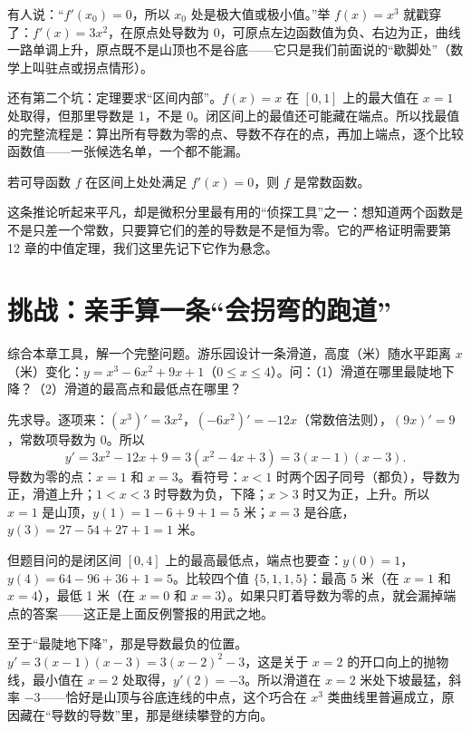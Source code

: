 \begin{fanli}
有人说：“$f'(x_0)=0$，所以 $x_0$ 处是极大值或极小值。”举 $f(x)=x^3$ 就戳穿了：$f'(x)=3x^2$，在原点处导数为 0，可原点左边函数值为负、右边为正，曲线一路单调上升，原点既不是山顶也不是谷底——它只是我们前面说的“歇脚处”（数学上叫驻点或拐点情形）。

还有第二个坑：定理要求“区间内部”。$f(x)=x$ 在 $[0,1]$ 上的最大值在 $x=1$ 处取得，但那里导数是 1，不是 0。闭区间上的最值还可能藏在端点。所以找最值的完整流程是：算出所有导数为零的点、导数不存在的点，再加上端点，逐个比较函数值——一张候选名单，一个都不能漏。
\end{fanli}

\begin{tuilun}
若可导函数 $f$ 在区间上处处满足 $f'(x)=0$，则 $f$ 是常数函数。
\end{tuilun}

这条推论听起来平凡，却是微积分里最有用的“侦探工具”之一：想知道两个函数是不是只差一个常数，只要算它们的差的导数是不是恒为零。它的严格证明需要第 12 章的中值定理，我们这里先记下它作为悬念。

\section{挑战：亲手算一条“会拐弯的跑道”}

综合本章工具，解一个完整问题。游乐园设计一条滑道，高度（米）随水平距离 $x$（米）变化：$y=x^3-6x^2+9x+1$（$0\le x\le 4$）。问：（1）滑道在哪里最陡地下降？（2）滑道的最高点和最低点在哪里？

先求导。逐项来：$(x^3)'=3x^2$，$(-6x^2)'=-12x$（常数倍法则），$(9x)'=9$，常数项导数为 0。所以
\[
y'=3x^2-12x+9=3(x^2-4x+3)=3(x-1)(x-3).
\]
导数为零的点：$x=1$ 和 $x=3$。看符号：$x<1$ 时两个因子同号（都负），导数为正，滑道上升；$1<x<3$ 时导数为负，下降；$x>3$ 时又为正，上升。所以 $x=1$ 是山顶，$y(1)=1-6+9+1=5$ 米；$x=3$ 是谷底，$y(3)=27-54+27+1=1$ 米。

但题目问的是闭区间 $[0,4]$ 上的最高最低点，端点也要查：$y(0)=1$，$y(4)=64-96+36+1=5$。比较四个值 $\{5,1,1,5\}$：最高 5 米（在 $x=1$ 和 $x=4$），最低 1 米（在 $x=0$ 和 $x=3$）。如果只盯着导数为零的点，就会漏掉端点的答案——这正是上面反例警报的用武之地。

至于“最陡地下降”，那是导数最负的位置。$y'=3(x-1)(x-3)=3(x-2)^2-3$，这是关于 $x=2$ 的开口向上的抛物线，最小值在 $x=2$ 处取得，$y'(2)=-3$。所以滑道在 $x=2$ 米处下坡最猛，斜率 $-3$——恰好是山顶与谷底连线的中点，这个巧合在 $x^3$ 类曲线里普遍成立，原因藏在“导数的导数”里，那是继续攀登的方向。


